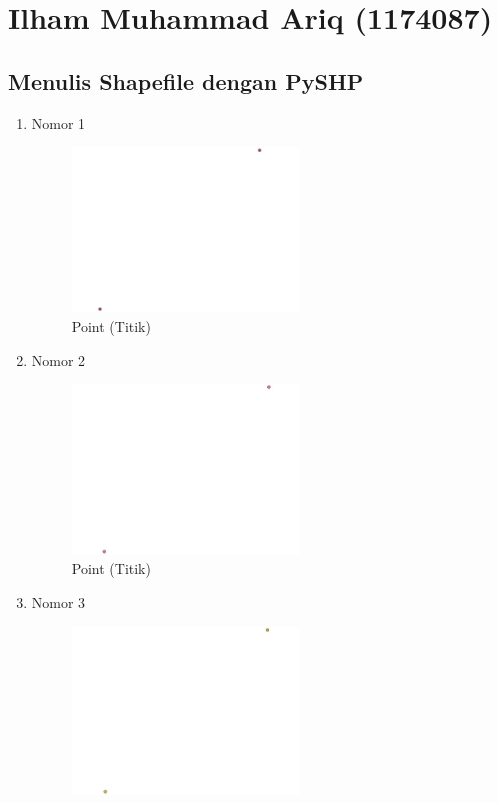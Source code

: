 \section{Ilham Muhammad Ariq (1174087)}
\subsection{Menulis Shapefile dengan PySHP}
\begin{enumerate}
	\item Nomor 1
	
	\begin{figure}[H]
		\includegraphics[width=6cm]{figures/Tugas2/1174087/no1.jpg}
		\centering
		\caption{Point (Titik)}
	\end{figure}
	\item Nomor 2
	
	\begin{figure}[H]
		\includegraphics[width=6cm]{figures/Tugas2/1174087/no2.jpg}
		\centering
		\caption{Point (Titik)}
	\end{figure}
	\item Nomor 3
	
	\begin{figure}[H]
		\includegraphics[width=6cm]{figures/Tugas2/1174087/no3.jpg}

\end{figure}
\end{enumerate}

